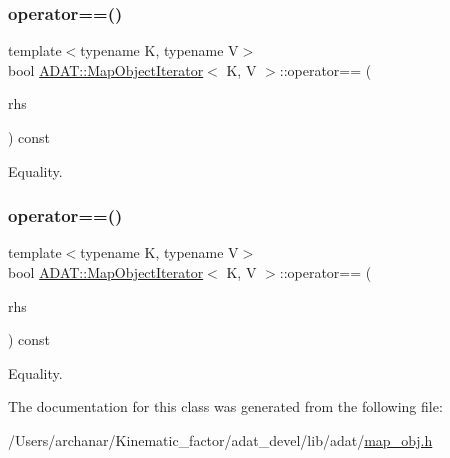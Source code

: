 \mbox{\label{classADAT_1_1MapObjectIterator_a3153929ca4103b625790fb1d09f33e71}} 
\subsubsection{\texorpdfstring{operator==()}{operator==()}\hspace{0.1cm}{\footnotesize\ttfamily [1/2]}}
{\footnotesize\ttfamily template$<$typename K, typename V$>$ \\
bool \mbox{\hyperlink{classADAT_1_1MapObjectIterator}{A\+D\+A\+T\+::\+Map\+Object\+Iterator}}$<$ K, V $>$\+::operator== (\begin{DoxyParamCaption}\item[{const \mbox{\hyperlink{classADAT_1_1MapObjectIterator}{Map\+Object\+Iterator}}$<$ K, V $>$ \&}]{rhs }\end{DoxyParamCaption}) const\hspace{0.3cm}{\ttfamily [inline]}}



Equality. 

\mbox{\label{classADAT_1_1MapObjectIterator_a3153929ca4103b625790fb1d09f33e71}} 
\subsubsection{\texorpdfstring{operator==()}{operator==()}\hspace{0.1cm}{\footnotesize\ttfamily [2/2]}}
{\footnotesize\ttfamily template$<$typename K, typename V$>$ \\
bool \mbox{\hyperlink{classADAT_1_1MapObjectIterator}{A\+D\+A\+T\+::\+Map\+Object\+Iterator}}$<$ K, V $>$\+::operator== (\begin{DoxyParamCaption}\item[{const \mbox{\hyperlink{classADAT_1_1MapObjectIterator}{Map\+Object\+Iterator}}$<$ K, V $>$ \&}]{rhs }\end{DoxyParamCaption}) const\hspace{0.3cm}{\ttfamily [inline]}}



Equality. 



The documentation for this class was generated from the following file\+:\begin{DoxyCompactItemize}
\item 
/\+Users/archanar/\+Kinematic\+\_\+factor/adat\+\_\+devel/lib/adat/\mbox{\hyperlink{lib_2adat_2map__obj_8h}{map\+\_\+obj.\+h}}\end{DoxyCompactItemize}
